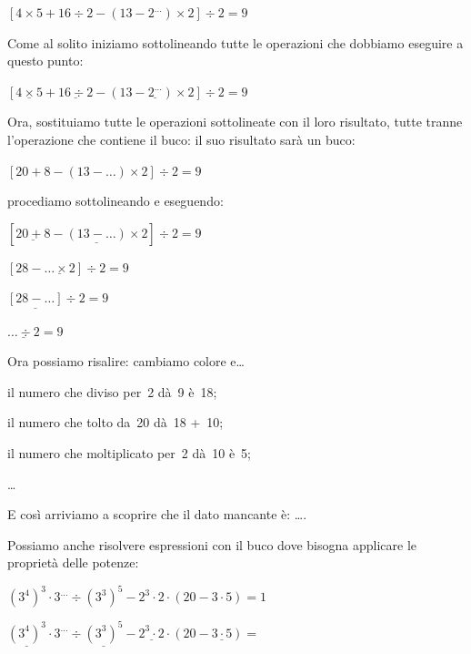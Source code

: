 \begin{exrig}
  \begin{esempio}
  \(\left[ 4 \times 5 + 16 \div 2 -
   \left(13 - 2^{\dots} \right) \times 2 \right] \div 2 = 9\)
  
  Come al solito iniziamo sottolineando tutte le operazioni che dobbiamo 
  eseguire a questo punto:
  
  \(\left[ \underline{4 \times 5} + \underline{16 \div 2} -
   \left(13 - \underline{2^{\dots}} \right) \times 2 \right] \div 2 = 9\)
  
  Ora, sostituiamo tutte le operazioni sottolineate con il loro risultato, 
  tutte tranne l'operazione che contiene il buco: il suo risultato sarà un 
  buco:
  
  \(\left[ 20 + 8 -
   \left(13 - {\dots} \right) \times 2 \right] \div 2 = 9\)
   
  procediamo sottolineando e eseguendo:
  
  \(\left[ \underline{20 + 8} -
   \underline{\left(13 - {\dots} \right)} \times 2 \right] \div 2 = 9\)
  
  \(\left[ 28 - \underline{{\dots} \times 2} \right] \div 2 = 9\)
  
  \(\underline{\left[ 28 - {\dots} \right]} \div 2 = 9\)
  
  \(\underline{{\dots} \div 2} = 9\)
  
  Ora possiamo risalire: cambiamo colore e\dots
  
  \begin{itemize*}
   \item il numero che diviso per~2 dà~9 è~18;
   \item il numero che tolto da~20 dà~18 +~10;
   \item il numero che moltiplicato per~2 dà~10 è~5;
   \item \dots
  \end{itemize*}

 E così arriviamo a scoprire che il dato mancante è: \dots.
 
 \end{esempio}

 \begin{esempio}

 Possiamo anche risolvere espressioni con il buco dove bisogna
 applicare le proprietà delle potenze:
 
 \(\left(3^4 \right)^3 \cdot 3^{\dots} \div \left(3^3 \right)^5 -
  2^{3} \cdot 2 \cdot \left( 20 - 3 \cdot 5 \right) = 1\)

 \(\underline{\left(3^4 \right)^3} \cdot 
  3^{\dots} \div \underline{\left(3^3 \right)^5} -
  \underline{2^{3} \cdot 2} \cdot 
  \left( 20 - \underline{3 \cdot 5} \right) =\)


\end{esempio}
\end{exrig}
